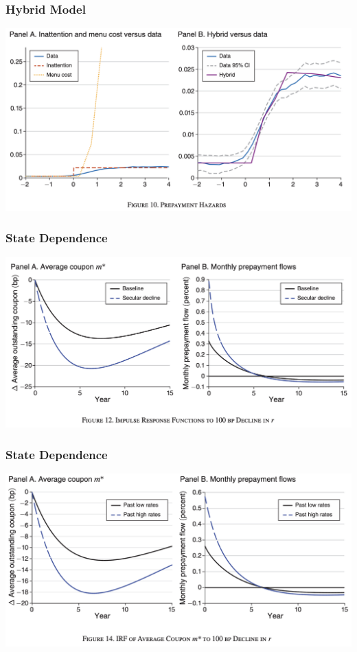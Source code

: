 \documentclass[english,xcolor=svgnames]{beamer}
\begin{document}
\begin{frame}
    \frametitle{Hybrid Model}
    \begin{center}
    	\includegraphics[scale=0.3]{figures/BMTVFIG10.png}	
    \end{center}
\end{frame}


\begin{frame}
    \frametitle{State Dependence}
    \begin{center}
    	\includegraphics[scale=0.3]{figures/BMTVFIG12.png}	
    \end{center}
\end{frame}

\begin{frame}
    \frametitle{State Dependence}
    \begin{center}
    	\includegraphics[scale=0.3]{figures/BMTVFIG13.png}	
    \end{center}
\end{frame}
\end{document}
